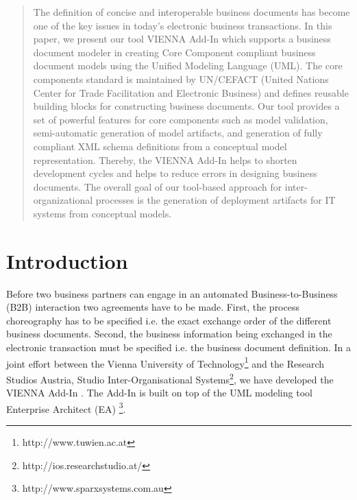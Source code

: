 \documentclass{acm_proc_article-sp}
\begin{document}
\maketitle
\begin{abstract}

The definition of concise and interoperable business documents has become one of the key issues in today's electronic business transactions. 
In this paper, we present our tool VIENNA Add-In which supports a business document modeler in creating Core Component compliant business document models using the Unified Modeling Language (UML). The core components standard is maintained by UN/CEFACT (United Nations Center for Trade Facilitation and Electronic Business) and defines reusable building blocks for constructing business documents. 
Our tool provides a set of powerful features for core components such as model validation, semi-automatic generation of model artifacts, and generation of fully compliant XML schema definitions from a conceptual model representation. Thereby, the VIENNA Add-In helps to shorten development cycles and helps to reduce errors in designing business documents. The overall goal of our tool-based approach for inter-organizational processes is the generation of deployment artifacts for IT systems from conceptual models.


\end{abstract}





\section{Introduction}

Before two business partners can engage in an automated Business-to-Business (B2B) interaction two agreements have to be made. First, the process choreography has to be specified i.e. the exact exchange order of the different business documents. Second, the business information being exchanged in the electronic transaction must be specified i.e. the business document definition. In a joint effort between the Vienna University of Technology\footnote{http://www.tuwien.ac.at} and the Research Studios Austria, Studio Inter-Organisational Systems\footnote{http://ios.researchstudio.at/}, we have developed the VIENNA Add-In \cite{man:VIENNAAddIn}. The Add-In is built on top of the UML modeling tool Enterprise Architect (EA) \footnote{http://www.sparxsystems.com.au}.
\end{document}
